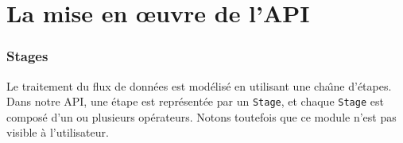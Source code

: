 
\chapter{La mise en \oe{}uvre de l'API}
\label{implementation.chap}


\subsection{Stages}

Le traitement du flux de donn\'ees est mod\'elis\'e en utilisant une cha\^{\i}ne d'\'etapes. Dans notre API, une \'etape est repr\'esent\'ee par un \texttt{Stage}, et chaque \texttt{Stage} est compos\'e d'un ou plusieurs op\'erateurs. Notons toutefois que ce module n'est pas visible \`a l'utilisateur. 


